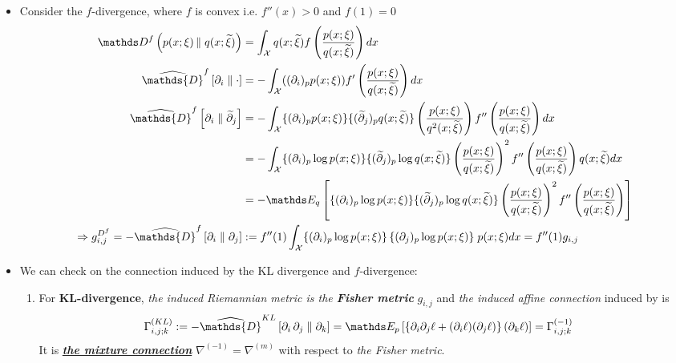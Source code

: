 \documentclass[11pt]{article}
\begin{document}
\begin{itemize}
\item \begin{example}
Consider the $f$-divergence, where $f$ is convex i.e. $f''(x) > 0$ and $f(1) = 0$
\begin{align}
\divg{f}{p(x; \xi)}{q(x; \widetilde{\xi})} &= \int_{\cX}q(x; \widetilde{\xi}) f\paren{\frac{p(x; \xi)}{q(x; \widetilde{\xi})}} dx  \nonumber\\
\widehat{\mathds{D}}^{f}\left[ \partial_i \;\|\;  \cdot \right] &= - \int_{\cX}((\partial_i)_p p(x; \xi))  f'\paren{\frac{p(x; \xi)}{q(x; \widetilde{\xi})}} dx  \nonumber\\
\widehat{\mathds{D}}^{f}\left[ \partial_i \;\|\;  \widetilde{\partial}_j \right]  &= - \int_{\cX}\{(\partial_i)_p p(x; \xi)\}\{(\widetilde{\partial}_j)_p q(x; \widetilde{\xi})\} \paren{\frac{p(x; \xi)}{q^2(x; \widetilde{\xi})}} f''\paren{\frac{p(x; \xi)}{q(x; \widetilde{\xi})}} dx \nonumber\\
&= - \int_{\cX}\{(\partial_i)_p \log p(x; \xi)\}\{(\widetilde{\partial}_j)_p \log q(x; \widetilde{\xi})\} \paren{\frac{p(x; \xi)}{q(x; \widetilde{\xi})}}^2 f''\paren{\frac{p(x; \xi)}{q(x; \widetilde{\xi})}} q(x; \widetilde{\xi}) dx \nonumber\\
&= - \E{q}{\{(\partial_i)_p \log p(x; \xi)\}\{(\widetilde{\partial}_j)_p \log q(x; \widetilde{\xi})\} \paren{\frac{p(x; \xi)}{q(x; \widetilde{\xi})}}^2 f''\paren{\frac{p(x; \xi)}{q(x; \widetilde{\xi})}}} \nonumber\\
\Rightarrow  g_{i,j}^{D^f} = -\widehat{\mathds{D}}^{f}\left[ \partial_i \;\|\;  \partial_j \right] &:=f''(1)   \int_{\cX}\{(\partial_i)_p \log p(x; \xi)\}\,\{({\partial}_j)_p \log p(x; {\xi})\}\;   p(x; {\xi})  dx = f''(1) g_{i,j}  \label{eqn: riemannian_metric_f_divg}
\end{align}
\end{example}


\item \begin{example}
We can check on the connection induced by the KL divergence and $f$-divergence:
\begin{enumerate}
\item For \textbf{KL-divergence}, \emph{the induced Riemannian metric is the \textbf{Fisher metric}} $g_{i,j}$ and \emph{the induced affine connection} induced by  is 
\begin{align}
\Gamma_{i,j;k}^{(KL)} :=- \widehat{\mathds{D}}^{KL}\left[ \partial_i\,\partial_j \;\|\;  {\partial}_k \right] &= \E{p}{\set{\partial_i \partial_j \ell  + (\partial_i \ell)(\partial_j \ell)} (\partial_k \ell)} = \Gamma_{i,j;k}^{(-1)}  \label{eqn: kl_divergence_affine_connection}
\end{align}  It is \underline{\emph{\textbf{the mixture connection}}} $\nabla^{(-1)}=\nabla^{(m)}$ with respect to \emph{the Fisher metric}.


\end{enumerate}
\end{example}
\end{itemize}
\end{document}
